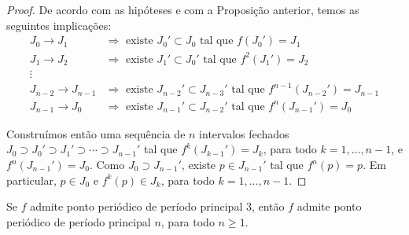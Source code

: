 \begin{proof}
De acordo com as hipóteses e com a Proposição anterior, temos as seguintes implicações:
\begin{align*}
J_0 \longrightarrow J_1 & \Rightarrow \textrm{ existe } J_0' \subset J_0 \textrm{ tal que } f(J_0') = J_1 \\
J_1 \longrightarrow J_2 & \Rightarrow \textrm{ existe } J_1' \subset J_0' \textrm{ tal que } f^2(J_1') = J_2 \\
\vdots \\
J_{n-2} \longrightarrow J_{n-1} & \Rightarrow \textrm{ existe } J_{n-2}' \subset J_{n-3}' \textrm{ tal que } f^{n-1}(J_{n-2}') = J_{n-1} \\
J_{n-1} \longrightarrow J_0 & \Rightarrow \textrm{ existe } J_{n-1}' \subset J_{n-2}' \textrm{ tal que } f^n(J_{n-1}') = J_0 
\end{align*}

Construímos então uma sequência de $n$ intervalos fechados $J_0 \supset J_0' \supset J_1' \supset \cdots \supset J_{n-1}'$ tal que $f^k(J_{k-1}') = J_k$, para todo $k = 1, \dots, n-1$, e $f^n(J_{n-1}') = J_0$. Como $J_0 \supset J_{n-1}'$, existe $p \in J_{n-1}'$ tal que $f^n(p) = p$. Em particular, $p \in J_0$ e $f^k(p) \in J_k$, para todo $k = 1, \dots, n-1$. 
\end{proof}

\begin{theorem}
Se $f$ admite ponto periódico de período principal $3$, então $f$ admite ponto periódico de período principal $n$, para todo $n \geq 1$.
\end{theorem}

